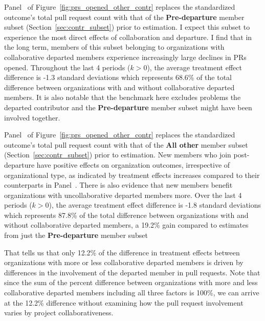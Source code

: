 \documentclass[12pt,notitlepage]{article}
\begin{document}
Panel~ of Figure~\ref{fig:prs_opened_other_contr} replaces the standardized outcome’s total pull request count with that of the \textbf{Pre-departure} member subset (Section~\ref{sec:contr_subset}) prior to estimation. I expect this subset to experience the most direct effects of collaboration and departure. I find that in the long term, members of this subset belonging to organizations with collaborative departed members experience increasingly large declines in PRs opened. Throughout the last 4 periods ($k > 0$), the average treatment effect difference is -1.3 standard deviations which represents 68.6\% of the total difference between organizations with and without collaborative departed members. It is also notable that the benchmark here excludes problems the departed contributor and the \textbf{Pre-departure} member subset might have been involved together. 

Panel~ of Figure~\ref{fig:prs_opened_other_contr} replaces the standardized outcome's total pull request count with that of the \textbf{All other} member subset (Section~\ref{sec:contr_subset}) prior to estimation. New members who join post-departure have positive effects on organization outcomes, irrespective of organizational type, as indicated by treatment effects increases compared to their counterparts in Panel~. 
There is also evidence that new members benefit organizations with uncollaborative departed members more. Over the last 4 periods ($k > 0$), the average treatment effect difference is -1.8 standard deviations which represents 87.8\% of the total difference between organizations with and without collaborative departed members, a 19.2\% gain compared to estimates from just the \textbf{Pre-departure} member subset 


That tells us that only 12.2\% of the difference in treatment effects between organizations with more or less collaborative departed members is driven by differences in the involvement of the departed member in pull requests. Note that since the sum of the percent difference between organizations with more and less collaborative departed members including all three factors is 100\%, we can arrive at the 12.2\% difference without examining how the pull request involvement varies by project collaborativeness. 
\end{document}
